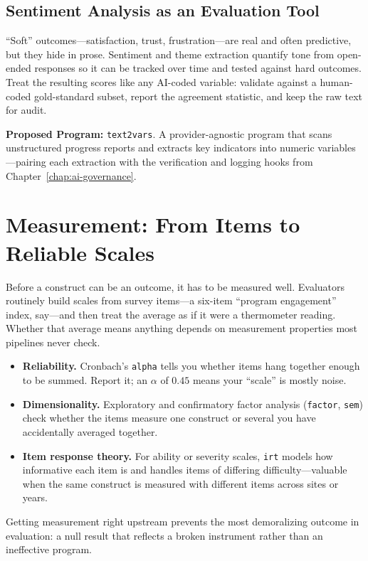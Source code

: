 \documentclass[
    a4paper,
    fontsize=10pt,
    twoside=true,
    numbers=noenddot,
]{kaobook}
\begin{document}
\subsection{Sentiment Analysis as an Evaluation Tool}
\enquote{Soft} outcomes---satisfaction, trust, frustration---are real and often predictive, but they hide in prose. Sentiment and theme extraction quantify tone from open-ended responses so it can be tracked over time and tested against hard outcomes. Treat the resulting scores like any AI-coded variable: validate against a human-coded gold-standard subset, report the agreement statistic, and keep the raw text for audit.

\begin{kaobox}[frametitle=Ado-file Idea: \texttt{text2vars}]
\textbf{Proposed Program:} \texttt{text2vars}. A provider-agnostic program that scans unstructured progress reports and extracts key indicators into numeric variables---pairing each extraction with the verification and logging hooks from Chapter~\ref{chap:ai-governance}.
\end{kaobox}

\section{Measurement: From Items to Reliable Scales}
Before a construct can be an outcome, it has to be measured well. Evaluators routinely build scales from survey items---a six-item \enquote{program engagement} index, say---and then treat the average as if it were a thermometer reading. Whether that average means anything depends on measurement properties most pipelines never check.
\begin{itemize}
    \item \textbf{Reliability.} Cronbach's \texttt{alpha} tells you whether items hang together enough to be summed. Report it; an $\alpha$ of $0.45$ means your \enquote{scale} is mostly noise.
    \item \textbf{Dimensionality.} Exploratory and confirmatory factor analysis (\texttt{factor}, \texttt{sem}) check whether the items measure one construct or several you have accidentally averaged together.
    \item \textbf{Item response theory.} For ability or severity scales, \texttt{irt} models how informative each item is and handles items of differing difficulty---valuable when the same construct is measured with different items across sites or years.
\end{itemize}
Getting measurement right upstream prevents the most demoralizing outcome in evaluation: a null result that reflects a broken instrument rather than an ineffective program.
\end{document}
